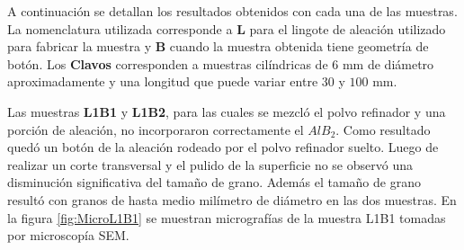 \documentclass[a4paper,12pt,fleqn,twoside,openany]{book}
\begin{document}
A continuación se detallan los resultados obtenidos con cada una de las muestras. La nomenclatura utilizada corresponde a \textbf{L} para el lingote de aleación utilizado para fabricar la muestra y \textbf{B} cuando la muestra obtenida tiene geometría de botón. Los \textbf{Clavos} corresponden a muestras cilíndricas de $6$ mm de diámetro aproximadamente y una longitud que puede variar entre $30$ y $100$ mm.
 
 Las muestras \textbf{ L1B1} y \textbf{L1B2}, para las cuales se mezcló el polvo refinador y una porción de aleación, no incorporaron correctamente el $AlB_2$. Como resultado quedó un botón de la aleación rodeado por el polvo refinador suelto. Luego de realizar un corte transversal y el pulido de la superficie no se observó una disminución significativa del tamaño de grano. Además el tamaño de grano resultó con granos de hasta medio milímetro de diámetro en las dos muestras. En la figura \ref{fig:MicroL1B1} se muestran micrografías de la muestra L1B1 tomadas por microscopía SEM.  
\end{document}
